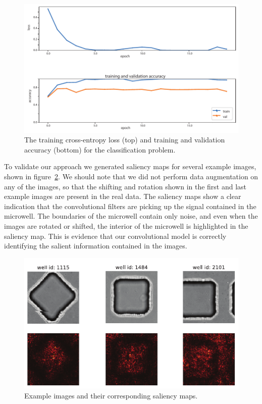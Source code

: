 \documentclass[10pt,twocolumn,letterpaper]{article}
\begin{document}
 \begin{figure}[t!]
\begin{center}
\includegraphics[width=0.8\linewidth]{figures/classification/classification_train_loss_train_and_val_loss.pdf}
\end{center}
   \caption{The training cross-entropy loss (top) and training and validation accuracy (bottom) for the classification problem.}
\label{classification_train_loss_train_and_val_loss}
\end{figure}

To validate our approach we generated saliency maps for several example images, shown in figure~\ref{saliency_maps}.  We should note that we did not perform data augmentation on any of the images, so that the shifting and rotation shown in the first and last example images are present in the real data.     The saliency maps show a clear indication that the convolutional filters are picking up the signal contained in the microwell.  The boundaries of the microwell contain only noise, and even when the images are rotated or shifted, the interior of the microwell is highlighted in the saliency map.  This is evidence that our convolutional model is correctly identifying the salient information contained in the images.

 \begin{figure}[t!]
\begin{center}
 \includegraphics[width=0.9\linewidth]{figures/saliency_maps.pdf}
\end{center}
   \caption{Example images and their corresponding saliency maps.}
\label{saliency_maps}
\end{figure}
\end{document}
